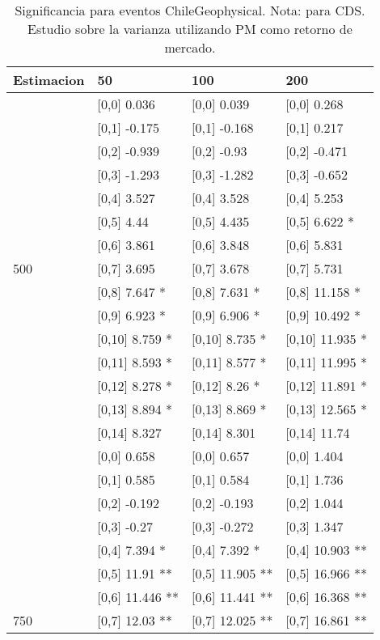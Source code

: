 \begin{table}

\caption{Significancia para eventos ChileGeophysical. Nota: para CDS. Estudio sobre la varianza utilizando PM como retorno de mercado.}
\centering
\begin{tabular}[t]{llll}
\toprule
Estimacion & 50 & 100 & 200\\
\midrule
 & {}[0,0] 0.036 & {}[0,0] 0.039 & {}[0,0] 0.268\\
 & {}[0,1] -0.175 & {}[0,1] -0.168 & {}[0,1] 0.217\\
 & {}[0,2] -0.939 & {}[0,2] -0.93 & {}[0,2] -0.471\\
 & {}[0,3] -1.293 & {}[0,3] -1.282 & {}[0,3] -0.652\\
 & {}[0,4] 3.527 & {}[0,4] 3.528 & {}[0,4] 5.253\\
\addlinespace
 & {}[0,5] 4.44 & {}[0,5] 4.435 & {}[0,5] 6.622 *\\
 & {}[0,6] 3.861 & {}[0,6] 3.848 & {}[0,6] 5.831\\
500 & {}[0,7] 3.695 & {}[0,7] 3.678 & {}[0,7] 5.731\\
 & {}[0,8] 7.647 * & {}[0,8] 7.631 * & {}[0,8] 11.158 *\\
 & {}[0,9] 6.923 * & {}[0,9] 6.906 * & {}[0,9] 10.492 *\\
\addlinespace
 & {}[0,10] 8.759 * & {}[0,10] 8.735 * & {}[0,10] 11.935 *\\
 & {}[0,11] 8.593 * & {}[0,11] 8.577 * & {}[0,11] 11.995 *\\
 & {}[0,12] 8.278 * & {}[0,12] 8.26 * & {}[0,12] 11.891 *\\
 & {}[0,13] 8.894 * & {}[0,13] 8.869 * & {}[0,13] 12.565 *\\
 & {}[0,14] 8.327 & {}[0,14] 8.301 & {}[0,14] 11.74\\
\addlinespace
 & {}[0,0] 0.658 & {}[0,0] 0.657 & {}[0,0] 1.404\\
 & {}[0,1] 0.585 & {}[0,1] 0.584 & {}[0,1] 1.736\\
 & {}[0,2] -0.192 & {}[0,2] -0.193 & {}[0,2] 1.044\\
 & {}[0,3] -0.27 & {}[0,3] -0.272 & {}[0,3] 1.347\\
 & {}[0,4] 7.394 * & {}[0,4] 7.392 * & {}[0,4] 10.903 **\\
\addlinespace
 & {}[0,5] 11.91 ** & {}[0,5] 11.905 ** & {}[0,5] 16.966 **\\
 & {}[0,6] 11.446 ** & {}[0,6] 11.441 ** & {}[0,6] 16.368 **\\
750 & {}[0,7] 12.03 ** & {}[0,7] 12.025 ** & {}[0,7] 16.861 **\\

\end{tabular}
\end{table}

